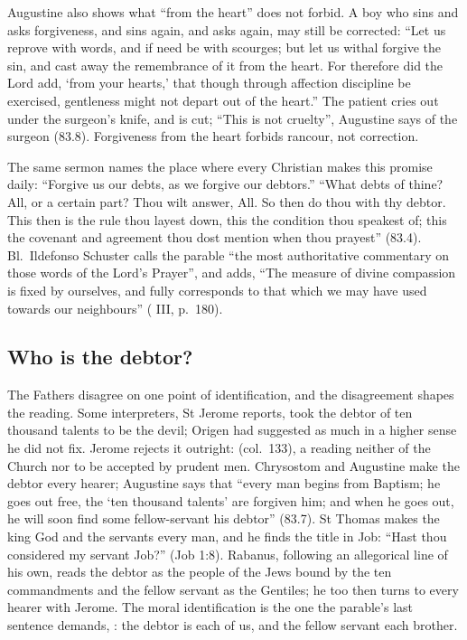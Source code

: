 Augustine also shows what ``from the heart'' does not forbid. A boy who sins and
asks forgiveness, and sins again, and asks again, may still be corrected: ``Let us
reprove with words, and if need be with scourges; but let us withal forgive the
sin, and cast away the remembrance of it from the heart. For therefore did the
Lord add, `from your hearts,' that though through affection discipline be
exercised, gentleness might not depart out of the heart.'' The patient cries out
under the surgeon's knife, and is cut; ``This is not cruelty'', Augustine says of
the surgeon (83.8). Forgiveness from the heart
forbids rancour, not correction.

The same sermon names the place where every Christian makes this promise daily:
``Forgive us our debts, as we forgive our debtors.'' ``What debts of thine? All,
or a certain part? Thou wilt answer, All. So then do thou with thy debtor. This
then is the rule thou layest down, this the condition thou speakest of; this the
covenant and agreement thou dost mention when thou prayest'' (83.4). Bl.\ Ildefonso
Schuster calls the parable ``the most authoritative commentary on those words of
the Lord's Prayer'', and adds, ``The measure of divine compassion is fixed by
ourselves, and fully corresponds to that which we may have used towards our
neighbours'' ( III, p.~180).

\subsection{Who is the debtor?}

The Fathers disagree on one point of identification, and the disagreement shapes
the reading. Some interpreters, St Jerome reports, took the debtor of ten thousand
talents to be the devil; Origen had suggested as much in a higher sense he did not
fix. Jerome rejects it outright:  (col.~133), a reading neither of the
Church nor to be accepted by prudent men. Chrysostom and Augustine make the
debtor every hearer; Augustine says that ``every man begins from Baptism; he goes
out free, the `ten thousand talents' are forgiven him; and when he goes out, he
will soon find some fellow-servant his debtor'' (83.7). St Thomas makes the king
God and the servants every man, and he finds the title in Job: ``Hast thou
considered my servant Job?'' (Job 1:8). Rabanus, following an allegorical line of
his own, reads the debtor as the people of the Jews bound by the ten
commandments and the fellow servant as the Gentiles; he too then turns to every
hearer with Jerome. The moral identification is the one the parable's last
sentence demands, : the debtor is each of us, and
the fellow servant each brother.

